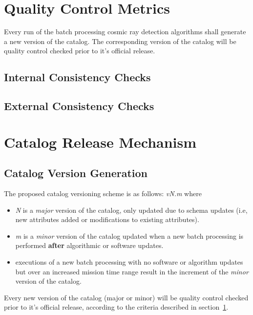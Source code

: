 \documentclass[a4paper, 11pt]{article}
\begin{document}
\section{Quality Control Metrics}
\label{sec:metrics}
Every run of the batch processing cosmic ray detection algorithms shall generate a new version of the catalog. The corresponding version of the catalog will be quality control checked prior to it's official release.

\subsection{Internal Consistency Checks}

\subsection{External Consistency Checks}

\section{Catalog Release Mechanism}
\label{sec:release}
\subsection{Catalog Version Generation}

The proposed catalog versioning scheme is as follows: \newline\newline  \textit{vN.m} \newline\newline where 

\begin{itemize}
\item \textit{N} is a \textit{major} version of the catalog, only updated due to schema updates (i.e, new attributes added or modifications to existing attributes).
\item \textit{m} is a \textit{minor} version of the catalog updated when a new batch processing is performed \textbf{after} algorithmic or software updates. 
\item executions of a new batch processing with no software or algorithm updates but over an increased mission time range result in the increment of the \textit{minor} version of the catalog.

\end{itemize}

Every new version of the catalog (major or minor) will be quality control checked prior to it's official release, according to the criteria described in section~\ref{sec:metrics}.
\end{document}
